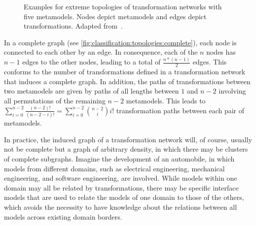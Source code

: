 \begin{figure}
    \centering
    \begin{minipage}[b]{0.49\columnwidth}
        \centering
        
        \label{fig:classification:topologies:complete}
    \end{minipage}
    \hfill
    \begin{minipage}[b]{0.49\columnwidth}
        \centering
        
        \vspace{1em}
        \label{fig:classification:topologies:tree}
    \end{minipage}
    \caption[Extremes of transformation network topologies]{Examples for extreme topologies of transformation networks with five metamodels. Nodes depict metamodels and edges depict transformations. Adapted from~.}
    \label{fig:classification:topologies}
\end{figure}

In a complete graph (see \autoref{fig:classification:topologies:complete}), each node is connected to each other by an edge.
In consequence, each of the $n$ nodes has $n-1$ edges to the other nodes, leading to a total of $\frac{n*(n-1)}{2}$ edges.
This conforms to the number of transformations defined in a transformation network that induces a complete graph.
In addition, the paths of transformations between two metamodels are given by paths of all lengths between $1$ and $n-2$ involving all permutations of the remaining $n-2$ metamodels.
This leads to $\sum_{i=0}^{n-2} \frac{(n-2)!}{(n-2-i)!} = \sum_{i=0}^{n-2} \binom{n-2}{i} i!$ transformation paths between each pair of metamodels.

In practice, the induced graph of a transformation network will, of course, usually not be complete but a graph of arbitrary density, in which there may be clusters of complete subgraphs.
Imagine the development of an automobile, in which models from different domains, such as electrical engineering, mechanical engineering, and software engineering, are involved. 
While models within one domain may all be related by transformations, there may be specific interface models that are used to relate the models of one domain to those of the others, which avoids the necessity to have knowledge about the relations between all models across existing domain borders.

